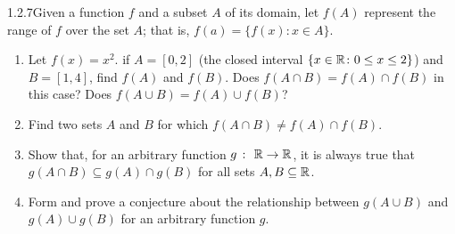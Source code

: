 \begin{exercise}
    {1.2.7}Given a function $f$ and a subset $A$ of its domain, let $f(A)$
represent the range of $f$ over the set $A$; that is, $f(a) = \{f(x) \colon x \in A\}$.
\begin{enumerate}
    \item Let $f(x) = x^2$. if $A = [0,2]$ (the closed interval $\{x \in \mathbb{R} \colon 0 \leq x \leq 2\}$) and $B = [1,4]$, find $f(A)$ and $f(B)$. Does $f(A\cap B) = f(A) \cap f(B)$ in this case? Does $f(A \cup B) = f(A) \cup f(B)$?
    \item Find two sets $A$ and $B$ for which $f(A\cap B) \ne f(A) \cap f(B)$.
    \item Show that, for an arbitrary function $g \ \colon \ \mathbb{R} \rightarrow \mathbb{R}$, it is always true that $g(A \cap B) \subseteq g(A) \cap g(B)$ for all sets $A,B\subseteq \mathbb{R}$.
    \item Form and prove a conjecture about the relationship between $g(A \cup B)$ and $g(A) \cup g(B)$ for an arbitrary function $g$.
\end{enumerate}
\end{exercise}

